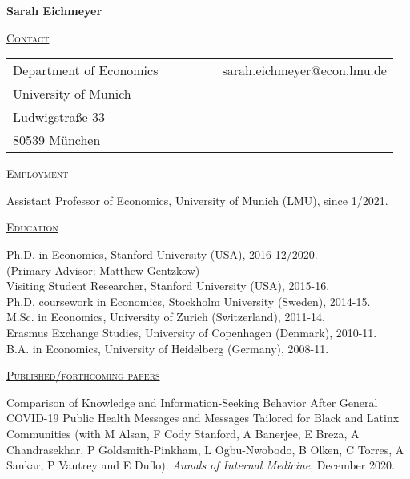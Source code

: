 \documentclass[letterpaper,11pt]{article}
\begin{document}
\begin{center}
\Large{\textbf{Sarah Eichmeyer}}
\end{center}



 \bigskip


 \underline {\textsc{Contact}}
 
\begin{tabular}{@{}l@{}cll@{}cl}
Department of Economics &&&&& sarah.eichmeyer@econ.lmu.de \\
University of Munich &&&&&  \\
Ludwigstraße 33
 && &&& \\
80539 München & & 
\end{tabular}

\bigskip
 
\underline {\textsc{Employment}}

Assistant Professor of Economics, University of Munich (LMU), since 1/2021. \\

\bigskip
 
\underline {\textsc{Education}}

Ph.D. in Economics, Stanford University (USA), 2016-12/2020. \\
\-\hspace{0.5cm} \small{(Primary Advisor: Matthew Gentzkow)} \\
Visiting Student Researcher, Stanford University (USA), 2015-16. \\
Ph.D. coursework in Economics, Stockholm University (Sweden), 2014-15. \\
M.Sc. in Economics, University of Zurich (Switzerland), 2011-14. \\
Erasmus Exchange Studies, University of Copenhagen (Denmark), 2010-11. \\
B.A. in Economics, University of Heidelberg (Germany), 2008-11.


\bigskip
  
 \underline {\textsc{Published/forthcoming papers}}

Comparison of Knowledge and Information-Seeking Behavior After General COVID-19 Public Health Messages and Messages Tailored for Black and Latinx Communities (with M Alsan, F Cody Stanford, A Banerjee, E Breza, A Chandrasekhar, P Goldsmith-Pinkham, L Ogbu-Nwobodo, B Olken, C Torres, A Sankar, P Vautrey and E Duflo). \textit{Annals of Internal Medicine}, December 2020.
 
\end{document}
